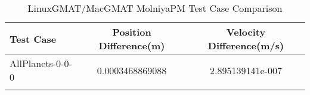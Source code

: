 \begin{table}[htbp!]
\centering
\caption{ LinuxGMAT/MacGMAT MolniyaPM Test Case Comparison}
      \begin{tabular}{lcc}
      \hline\hline
          Test Case & Position Difference(m) & Velocity Difference(m/s) \\
         \hline
         AllPlanets-0-0-0 & 0.0003468869088 & 2.895139141e-007 \\
      \hline\hline
      \label{Table: MolniyaPM LinuxGMAT-MacGMAT Table} 
\end{tabular}
\end{table}
